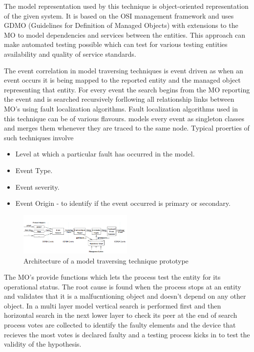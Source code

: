 \documentclass[10pt]{sigplan-proc-varsize}
\begin{document}
The model representation used by this technique is object-oriented representation of the given system. It is based on the OSI management framework and uses GDMO (Guidelines for  Definition  of Managed Objects) with extensions to the MO to model dependencies and services between the entities. This approach can make automated testing possible which can test for various testing entities availability and quality of service standards. 

The event correlation in model traversing techniques is event driven as when an event occurs it is being mapped to the reported entity and the managed object representing that entity. For every event the search begins from the MO reporting the event and is searched recursively forllowing all relationship links between MO's using fault localization algorithms.  Fault localization algorithms used in this technique can be of various flavours.  models every event as singleton classes and merges them whenever they are traced to the same node. Typical proerties of such techniques involve 

\begin{itemize}
  \item Level at which a particular fault has occurred in the model.
  \item Event Type.
  \item Event severity.
  \item Event Origin - to identify if the event occurred is primary or secondary.
\end{itemize}

\begin{figure}[h!]
  \caption{Architecture of a model traversing technique prototype}
  \centering
    \includegraphics[width=0.5\textwidth]{Fig3}
\end{figure}

The MO's provide functions which lets the process test the entity for its operational status.  The root cause is found when the process stops at an entity and validates that it is a malfucntioning object and doesn't depend on any other object. In a multi layer model vertical search is performed first and then horizontal search in the next lower layer to check its peer at the end of search process votes are collected to identify the faulty elements and the device that recieves the most votes is declared faulty and a testing process kicks in to test the validity of the hypothesis. 
\end{document}
